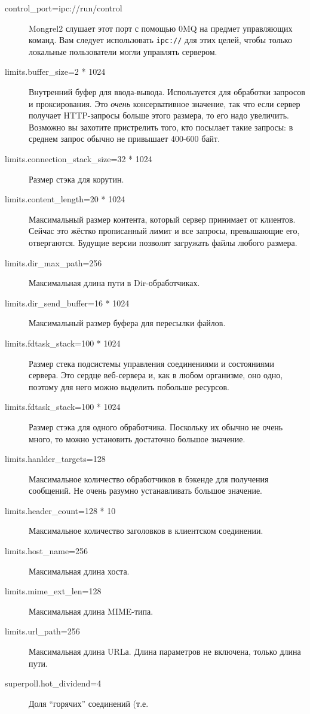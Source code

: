 \begin{description}
\item[control\_port=ipc://run/control] Mongrel2 слушает этот порт с
помощью 0MQ на предмет управляющих команд. Вам следует использовать
\verb|ipc://| для этих целей, чтобы только локальные пользователи
могли управлять сервером.
\item[limits.buffer\_size=2 * 1024] Внутренний буфер для ввода-вывода.
Используется для обработки запросов и проксирования. Это \emph{очень}
консервативное значение, так что если сервер получает HTTP-запросы
больше этого размера, то его надо увеличить. Возможно вы захотите
пристрелить того, кто посылает такие запросы: в среднем запрос обычно
не привышает 400-600 байт.
\item[limits.connection\_stack\_size=32 * 1024] Размер стэка для
корутин.
\item[limits.content\_length=20 * 1024] Максимальный размер контента,
который сервер принимает от клиентов. Сейчас это жёстко прописанный
лимит и все запросы, превышающие его, отвергаются. Будущие версии
позволят загружать файлы любого размера.
\item[limits.dir\_max\_path=256] Максимальная длина пути в
Dir-обработчиках.
\item[limits.dir\_send\_buffer=16 * 1024] Максимальный размер буфера
для пересылки файлов.
\item[limits.fdtask\_stack=100 * 1024] Размер стека подсистемы
управления соединениями и состояниями сервера. Это сердце веб-сервера
и, как в любом организме, оно одно, поэтому для него можно выделить
побольше ресурсов.
\item[limits.fdtask\_stack=100 * 1024] Размер стэка для одного
обработчика. Поскольку их обычно не очень много, то можно установить
достаточно большое значение. 
\item[limits.hanlder\_targets=128] Максимальное количество
обработчиков в бэкенде для получения сообщений. Не очень разумно
устанавливать большое значение.
\item[limits.header\_count=128 * 10] Максимальное количество
заголовков в клиентском соединении.
\item[limits.host\_name=256] Максимальная длина хоста.
\item[limits.mime\_ext\_len=128] Максимальная длина MIME-типа.
\item[limits.url\_path=256] Максимальная длина URLа. Длина параметров
не включена, только длина пути.
\item[superpoll.hot\_dividend=4] Доля ``горячих'' соединений (т.е.

\end{description}
